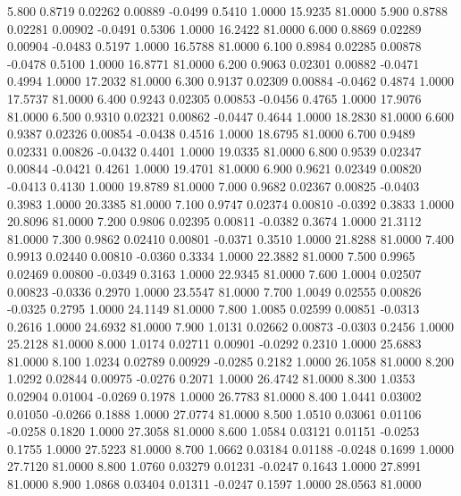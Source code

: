    5.800   0.8719   0.02262   0.00889  -0.0499   0.5410   1.0000  15.9235  81.0000
   5.900   0.8788   0.02281   0.00902  -0.0491   0.5306   1.0000  16.2422  81.0000
   6.000   0.8869   0.02289   0.00904  -0.0483   0.5197   1.0000  16.5788  81.0000
   6.100   0.8984   0.02285   0.00878  -0.0478   0.5100   1.0000  16.8771  81.0000
   6.200   0.9063   0.02301   0.00882  -0.0471   0.4994   1.0000  17.2032  81.0000
   6.300   0.9137   0.02309   0.00884  -0.0462   0.4874   1.0000  17.5737  81.0000
   6.400   0.9243   0.02305   0.00853  -0.0456   0.4765   1.0000  17.9076  81.0000
   6.500   0.9310   0.02321   0.00862  -0.0447   0.4644   1.0000  18.2830  81.0000
   6.600   0.9387   0.02326   0.00854  -0.0438   0.4516   1.0000  18.6795  81.0000
   6.700   0.9489   0.02331   0.00826  -0.0432   0.4401   1.0000  19.0335  81.0000
   6.800   0.9539   0.02347   0.00844  -0.0421   0.4261   1.0000  19.4701  81.0000
   6.900   0.9621   0.02349   0.00820  -0.0413   0.4130   1.0000  19.8789  81.0000
   7.000   0.9682   0.02367   0.00825  -0.0403   0.3983   1.0000  20.3385  81.0000
   7.100   0.9747   0.02374   0.00810  -0.0392   0.3833   1.0000  20.8096  81.0000
   7.200   0.9806   0.02395   0.00811  -0.0382   0.3674   1.0000  21.3112  81.0000
   7.300   0.9862   0.02410   0.00801  -0.0371   0.3510   1.0000  21.8288  81.0000
   7.400   0.9913   0.02440   0.00810  -0.0360   0.3334   1.0000  22.3882  81.0000
   7.500   0.9965   0.02469   0.00800  -0.0349   0.3163   1.0000  22.9345  81.0000
   7.600   1.0004   0.02507   0.00823  -0.0336   0.2970   1.0000  23.5547  81.0000
   7.700   1.0049   0.02555   0.00826  -0.0325   0.2795   1.0000  24.1149  81.0000
   7.800   1.0085   0.02599   0.00851  -0.0313   0.2616   1.0000  24.6932  81.0000
   7.900   1.0131   0.02662   0.00873  -0.0303   0.2456   1.0000  25.2128  81.0000
   8.000   1.0174   0.02711   0.00901  -0.0292   0.2310   1.0000  25.6883  81.0000
   8.100   1.0234   0.02789   0.00929  -0.0285   0.2182   1.0000  26.1058  81.0000
   8.200   1.0292   0.02844   0.00975  -0.0276   0.2071   1.0000  26.4742  81.0000
   8.300   1.0353   0.02904   0.01004  -0.0269   0.1978   1.0000  26.7783  81.0000
   8.400   1.0441   0.03002   0.01050  -0.0266   0.1888   1.0000  27.0774  81.0000
   8.500   1.0510   0.03061   0.01106  -0.0258   0.1820   1.0000  27.3058  81.0000
   8.600   1.0584   0.03121   0.01151  -0.0253   0.1755   1.0000  27.5223  81.0000
   8.700   1.0662   0.03184   0.01188  -0.0248   0.1699   1.0000  27.7120  81.0000
   8.800   1.0760   0.03279   0.01231  -0.0247   0.1643   1.0000  27.8991  81.0000
   8.900   1.0868   0.03404   0.01311  -0.0247   0.1597   1.0000  28.0563  81.0000
